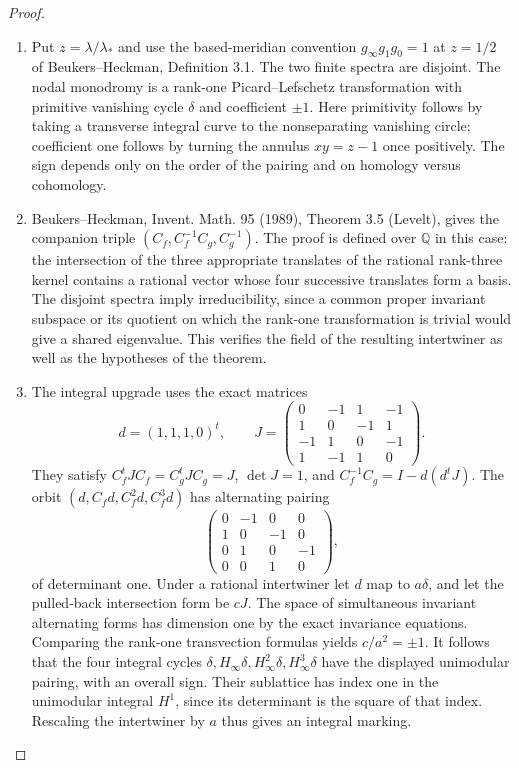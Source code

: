 \documentclass[11pt,a4paper]{article}
\theoremstyle{definition}
\begin{document}
\begin{proof}
\begin{enumerate}[label=\arabic*.]
\item Put $z=\lambda/\lambda_*$ and use the based-meridian convention
$g_\infty g_1g_0=1$ at $z=1/2$ of Beukers--Heckman,
Definition 3.1.  The two finite spectra are disjoint.  The nodal
monodromy is a rank-one Picard--Lefschetz transformation with primitive
vanishing cycle $\delta$ and coefficient $\pm1$.
Here primitivity follows by taking a transverse integral curve to the
nonseparating vanishing circle; coefficient one follows by turning the
annulus $xy=z-1$ once positively.  The sign depends only on the order
of the pairing and on homology versus cohomology.

\item Beukers--Heckman, Invent. Math. 95 (1989), Theorem 3.5 (Levelt), gives
the companion triple $(C_f,C_f^{-1}C_g,C_g^{-1})$.
The proof is defined over $\mathbb Q$ in this case: the intersection of
the three appropriate translates of the rational rank-three kernel
contains a rational vector whose four successive translates form a
basis.  The disjoint spectra imply irreducibility, since a common
proper invariant subspace or its quotient on which the rank-one
transformation is trivial would give a shared eigenvalue.  This
verifies the field of the resulting intertwiner as well as the
hypotheses of the theorem.

\item The integral upgrade uses the exact matrices
\[
d=(1,1,1,0)^t,\qquad
J=\begin{pmatrix}
0&-1&1&-1\\1&0&-1&1\\-1&1&0&-1\\1&-1&1&0
\end{pmatrix}.
\]
They satisfy $C_f^tJC_f=C_g^tJC_g=J$, $\det J=1$, and
$C_f^{-1}C_g=I-d(d^tJ)$.
The orbit $(d,C_fd,C_f^2d,C_f^3d)$ has alternating pairing
\[
\begin{pmatrix}0&-1&0&0\\1&0&-1&0\\0&1&0&-1\\0&0&1&0\end{pmatrix},
\]
of determinant one.  Under a rational intertwiner let $d$ map to
$a\delta$, and let the pulled-back intersection form be $cJ$.
The space of simultaneous invariant alternating forms has dimension
one by the exact invariance equations.  Comparing the rank-one
transvection formulas yields $c/a^2=\pm1$.
It follows that the four integral cycles
$\delta,H_\infty\delta,H_\infty^2\delta,H_\infty^3\delta$ have the
displayed unimodular pairing, with an overall sign.  Their sublattice
has index one in the unimodular integral $H^1$, since its determinant
is the square of that index.  Rescaling the intertwiner by $a$ thus
gives an integral marking.


\end{enumerate}
\end{proof}
\end{document}
